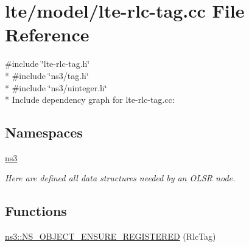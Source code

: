 \hypertarget{lte-rlc-tag_8cc}{}\section{lte/model/lte-\/rlc-\/tag.cc File Reference}
\label{lte-rlc-tag_8cc}
{\ttfamily \#include \char`\"{}lte-\/rlc-\/tag.\+h\char`\"{}}\\*
{\ttfamily \#include \char`\"{}ns3/tag.\+h\char`\"{}}\\*
{\ttfamily \#include \char`\"{}ns3/uinteger.\+h\char`\"{}}\\*
Include dependency graph for lte-\/rlc-\/tag.cc\+:
\subsection*{Namespaces}
\begin{DoxyCompactItemize}
\item 
 \hyperlink{namespacens3}{ns3}
\begin{DoxyCompactList}\small\item\em Here are defined all data structures needed by an O\+L\+SR node. \end{DoxyCompactList}\end{DoxyCompactItemize}
\subsection*{Functions}
\begin{DoxyCompactItemize}
\item 
\hyperlink{namespacens3_a7cf8340c20524aae0f83dafa6cb1f236}{ns3\+::\+N\+S\+\_\+\+O\+B\+J\+E\+C\+T\+\_\+\+E\+N\+S\+U\+R\+E\+\_\+\+R\+E\+G\+I\+S\+T\+E\+R\+ED} (Rlc\+Tag)
\end{DoxyCompactItemize}
